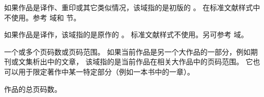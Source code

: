 \begin{fieldlist}



如果作品是译作、重印或其它类似情况，该域指的是初版的 。
在标准文献样式中不使用。参考  域和  节。




如果作品是译作，该域指的是原作的 。
标准文献样式不使用。另可参考  域。




一个或多个页码数或页码范围。
如果当前作品是另一个大作品的一部分，例如期刊或文集析出中的文章，
该域指的是当前作品在相关大作品中的页码范围。
它也可以用于限定著作中某一特定部分（例如一本书中的一章）。




作品的总页码数。





\end{fieldlist}
